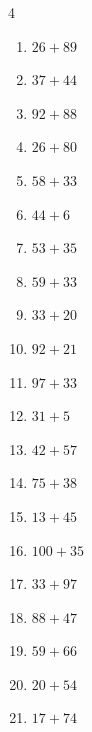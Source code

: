 \begin{multicols}{4}
\begin{enumerate}
  \item $26+89$
        \phantom{$=115$}

  \item $37+44$
        \phantom{$=81$}

  \item $92+88$
        \phantom{$=180$}

  \item $26+80$
        \phantom{$=106$}

  \item $58+33$
        \phantom{$=91$}

  \item $44+6$
        \phantom{$=50$}

  \item $53+35$
        \phantom{$=88$}

  \item $59+33$
        \phantom{$=92$}

  \item $33+20$
        \phantom{$=53$}

  \item $92+21$
        \phantom{$=113$}

  \item $97+33$
        \phantom{$=130$}

  \item $31+5$
        \phantom{$=36$}

  \item $42+57$
        \phantom{$=99$}

\columnbreak %

  \item $75+38$
        \phantom{$=113$}

  \item $13+45$
        \phantom{$=58$}

  \item $100+35$
        \phantom{$=135$}

  \item $33+97$
        \phantom{$=130$}

  \item $88+47$
        \phantom{$=135$}

  \item $59+66$
        \phantom{$=125$}

  \item $20+54$
        \phantom{$=74$}

  \item $17+74$
        \phantom{$=91$}


\end{enumerate}
\end{multicols}
